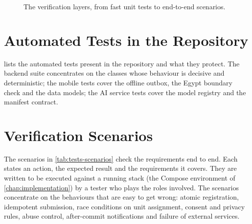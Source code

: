 \begin{figure}[!htbp]\centering
{}
\caption{The verification layers, from fast unit tests to end-to-end scenarios.}\label{fig:test-layers}
\end{figure}

\section{Automated Tests in the Repository}

 lists the automated tests present in the repository and what they protect. The backend suite
concentrates on the classes whose behaviour is decisive and deterministic; the mobile tests cover the offline outbox, the
Egypt boundary check and the data models; the AI service tests cover the model registry and the manifest contract.



\section{Verification Scenarios}\label{sec:scenarios}

The scenarios in \cref{tab:tests-scenarios} check the requirements end to end. Each states an action, the expected
result and the requirements it covers. They are written to be executed against a running stack (the Compose environment
of \cref{chap:implementation}) by a tester who plays the roles involved. The scenarios concentrate on the behaviours that are
easy to get wrong: atomic registration, idempotent submission, race conditions on unit assignment, consent and
privacy rules, abuse control, after-commit notifications and failure of external services.

